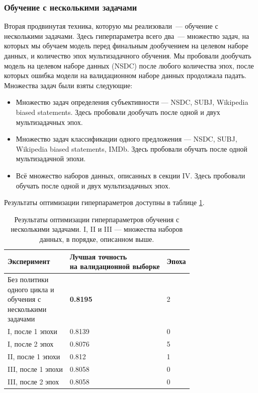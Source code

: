 \documentclass[conference]{IEEEtran}
\begin{document}
\subsubsection{Обучение с несколькими задачами}
Вторая продвинутая техника, которую мы реализовали~--- обучение с несколькими задачами. Здесь гиперпараметра всего два~--- множество задач, на которых мы обучаем модель перед финальным дообучением на целевом наборе данных, и количество эпох мультизадачного обучения. Мы пробовали дообучать модель на целевом наборе данных (NSDC) после любого количества эпох, после которых ошибка модели на валидационном наборе данных продолжала падать. Множества задач были взяты следующие: 
\begin{itemize}
    \item Множество задач определения субъективности --- NSDC, SUBJ, Wikipedia biased statements. Здесь пробовали дообучать после одной и двух мультизадачных эпох.
    \item Множество задач классификации одного предложения --- NSDC, SUBJ, Wikipedia biased statements, IMDb. Здесь пробовали обучать после одной мультизадачной эпохи.
    \item Всё множество наборов данных, описанных в секции IV. Здесь пробовали обучать после одной и двух мультизадачных эпох.
\end{itemize}
Результаты оптимизации гиперпараметров доступны в таблице \ref{tab:multi-task-learning-optimization-results}.
\begin{table}[h!]
    \begin{center}
        \begin{tabular}{|l|l|l|}
            \hline
            Эксперимент & \thead{Лучшая точность \\ на валидационной выборке} & Эпоха \\ \hline
            \makecell[l]{Без политики \\ одного цикла и \\ обучения с \\ несколькими \\ задачами} & \textbf{0.8195} & 2 \\ \hline
            I, после 1 эпохи & 0.8139 & 0 \\ \hline
            I, после 2 эпох & 0.8076 & 5 \\ \hline
            II, после 1 эпохи & 0.812 & 1 \\ \hline
            III, после 1 эпохи & 0.8058 & 0 \\ \hline
            III, после 2 эпох & 0.8058 & 0 \\ \hline
        \end{tabular}
        \caption{Результаты оптимизации гиперпараметров обучения с несколькими задачами. I, II и III --- множества наборов данных, в порядке, описанном выше.}
        \label{tab:multi-task-learning-optimization-results}    
    \end{center}
\end{table}
\end{document}

